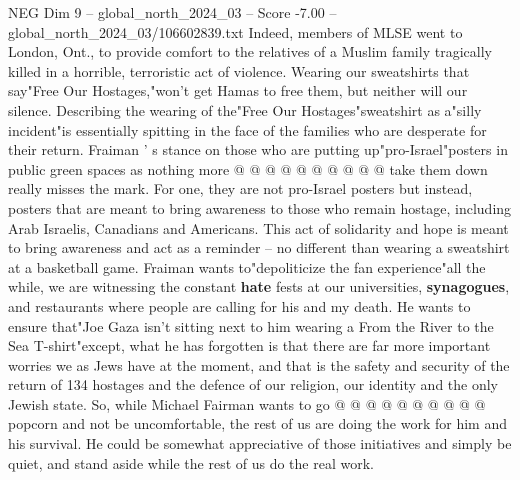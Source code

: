 \begin{textsample}{NEG Dim 9 – global\_north\_2024\_03 – Score -7.00 – global\_north\_2024\_03/106602839.txt}
Indeed, members of MLSE went to London, Ont., to provide comfort to the relatives of a Muslim family tragically killed in a horrible, terroristic act of violence.
Wearing our sweatshirts that say"Free Our Hostages,"won't get Hamas to free them, but neither will our silence.
Describing the wearing of the"Free Our Hostages"sweatshirt as a"silly incident"is essentially spitting in the face of the families who are desperate for their return.
Fraiman ' s stance on those who are putting up"pro-Israel"posters in public green spaces as nothing more @ @ @ @ @ @ @ @ @ @ take them down really misses the mark.
For one, they are not pro-Israel posters but instead, posters that are meant to bring awareness to those who remain hostage, including Arab Israelis, Canadians and Americans.
This act of solidarity and hope is meant to bring awareness and act as a reminder -- no different than wearing a sweatshirt at a basketball game.
Fraiman wants to"depoliticize the fan experience"all the while, we are witnessing the constant \textbf{hate} fests at our universities, \textbf{synagogues}, and restaurants where people are calling for his and my death.
He wants to ensure that"Joe Gaza isn't sitting next to him wearing a From the River to the Sea T-shirt"except, what he has forgotten is that there are far more important worries we as Jews have at the moment, and that is the safety and security of the return of 134 hostages and the defence of our religion, our identity and the only Jewish state.
So, while Michael Fairman wants to go @ @ @ @ @ @ @ @ @ @ popcorn and not be uncomfortable, the rest of us are doing the work for him and his survival.
He could be somewhat appreciative of those initiatives and simply be quiet, and stand aside while the rest of us do the real work.

\end{textsample}
